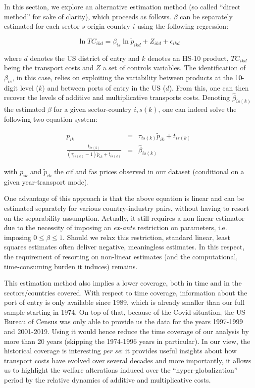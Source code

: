 \documentclass[11pt,twoside, authoryear]{elsarticle}
\begin{document}
In this section, we explore an alternative estimation method (so called ``direct method'' for sake of clarity), which proceeds as follows. $\beta$ can be separately estimated for each sector $s$-origin country $i$ using the following regression:

\begin{equation}
\ln TC_{ikd} = \beta_{is}\ln \tilde{p}_{ikd} + Z_{ikd} +\epsilon_{ikd} \label{eq:estimation_ref1}
\end{equation}

\noindent where $d$ denotes the US district of entry and $k$ denotes an HS-10 product, $TC_{ikd}$ being the transport costs and $Z$ a set of controls variables. The identification of $\beta_{is}$, in this case, relies on exploiting the variability between products at the 10-digit
level ($k$) and between ports of entry in the US ($d$). From this, one can then recover the levels of additive and multiplicative transports costs. Denoting $\widehat{\beta}_{is(k)}$ the estimated $\beta$ for a given sector-country $i,s(k)$, one can indeed solve the following two-equation system:

\begin{eqnarray*}
p_{ik} &=& \tau_{is(k)}\widetilde{p}_{ik} +t_{is(k)} \label{eq:system1}\\
\frac{t_{is(k)}}{(\tau_{is(k)}-1)\widetilde{p}_{ik}+ t_{is(k)}} &=& \widehat{\beta}_{is(k)}  \label{eq:system2}
\end{eqnarray*}


\noindent with $p_{ik}$ and $\widetilde{p}_{ik}$ the cif and fas prices observed in our dataset (conditional on a given year-transport mode).

One advantage of this approach is that the above equation is linear and can be estimated separately for various country-industry pairs, without having to resort on the separability assumption. Actually, it still requires a non-linear estimator due to the necessity of imposing an \textit{ex-ante} restriction on parameters, i.e. imposing $0 \leq  \beta \leq 1$. Should we relax this restriction, standard linear, least squares estimates often deliver negative, meaningless estimates. In this respect, the requirement of resorting on non-linear estimates (and the computational, time-consuming burden it induces) remains.

This estimation method also implies a lower coverage, both in time and in the sectors/countries covered. With respect to time coverage, information about the port of entry is only available since 1989, which is already smaller than our full sample starting in 1974. On top of that, because of the Covid situation, the US Bureau of Census was only able to provide us the data for the years 1997-1999 and 2001-2019. Using it would hence reduce the time coverage of our analysis by more than 20 years (skipping the 1974-1996 years in particular). In our view, the historical coverage is interesting \emph{per se}: it provides useful insights about how transport costs have evolved over several decades and more importantly, it allows us to highlight the welfare alterations induced over the ``hyper-globalization'' period by the relative dynamics of additive and multiplicative costs.
\end{document}

